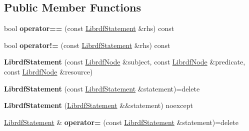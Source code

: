 \subsection*{Public Member Functions}
\begin{DoxyCompactItemize}
\item 
\mbox{\label{classredland_1_1LibrdfStatement_ada81e9bfb312e25daf20d6dda10eeb2e}} 
bool {\bfseries operator==} (const \hyperlink{classredland_1_1LibrdfStatement}{Librdf\+Statement} \&rhs) const
\item 
\mbox{\label{classredland_1_1LibrdfStatement_ad3d6c126b90c0d93413a08353c496f8f}} 
bool {\bfseries operator!=} (const \hyperlink{classredland_1_1LibrdfStatement}{Librdf\+Statement} \&rhs) const
\item 
\mbox{\label{classredland_1_1LibrdfStatement_ae7f7e27b7a502070195103268407243a}} 
{\bfseries Librdf\+Statement} (const \hyperlink{classredland_1_1LibrdfNode}{Librdf\+Node} \&subject, const \hyperlink{classredland_1_1LibrdfNode}{Librdf\+Node} \&predicate, const \hyperlink{classredland_1_1LibrdfNode}{Librdf\+Node} \&resource)
\item 
\mbox{\label{classredland_1_1LibrdfStatement_a344ec4a937a1d67589ebc7247b3f08c6}} 
{\bfseries Librdf\+Statement} (const \hyperlink{classredland_1_1LibrdfStatement}{Librdf\+Statement} \&statement)=delete
\item 
\mbox{\label{classredland_1_1LibrdfStatement_aea171565ffb3ecc8d9c1db5439314306}} 
{\bfseries Librdf\+Statement} (\hyperlink{classredland_1_1LibrdfStatement}{Librdf\+Statement} \&\&statement) noexcept
\item 
\mbox{\label{classredland_1_1LibrdfStatement_a7aeb5ac71f5583b5a56b4aad7d904381}} 
\hyperlink{classredland_1_1LibrdfStatement}{Librdf\+Statement} \& {\bfseries operator=} (const \hyperlink{classredland_1_1LibrdfStatement}{Librdf\+Statement} \&statement)=delete
\item 
\mbox{\label{classredland_1_1LibrdfStatement_a6cebbcea1400ba2983b25096f3db3b3c}} 

\end{DoxyCompactItemize}
